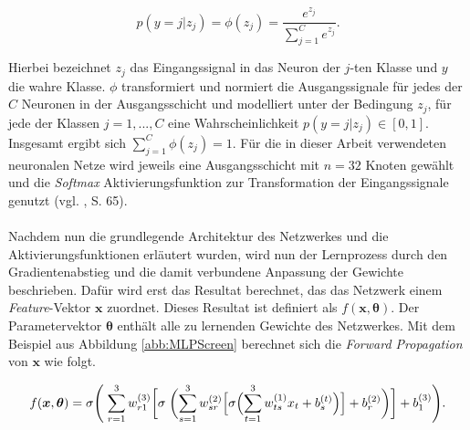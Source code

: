 \documentclass[a4paper,11pt]{article}
\begin{document}
\[p(y = j |z_j) = \phi(z_j) = \frac{e^{z_j}}{\sum_{j=1}^C e^{z_j}} .\]

Hierbei bezeichnet $z_j$ das Eingangssignal in das Neuron der $j$-ten Klasse und $y$ die wahre Klasse. $\phi$ transformiert und normiert die Ausgangssignale für jedes der $C$ Neuronen in der Ausgangsschicht und modelliert unter der Bedingung $z_j$, für jede der Klassen $j = 1,..., C$ eine Wahrscheinlichkeit $p(y=j|z_j) \in \left[0, 1\right]$. Insgesamt ergibt sich $\sum_{j = 1}^C \phi(z_j) = 1$. Für die in dieser Arbeit verwendeten neuronalen Netze wird jeweils eine Ausgangsschicht mit $n = 32$ Knoten gewählt und die \textit{Softmax} Aktivierungsfunktion zur Transformation der Eingangssignale genutzt (vgl. \cite{deepEssentials}, S. 65).\\
\\
Nachdem nun die grundlegende Architektur des Netzwerkes und die Aktivierungsfunktionen erläutert wurden, wird nun der Lernprozess durch den Gradientenabstieg und die damit verbundene Anpassung der Gewichte beschrieben. Dafür wird erst das Resultat berechnet, das das Netzwerk einem \textit{Feature}-Vektor $\bm{x}$ zuordnet. Dieses Resultat ist definiert als $f(\bm{x}, \bm{\theta})$. Der Parametervektor $\bm{\theta}$ enthält alle zu lernenden Gewichte des Netzwerkes. Mit dem Beispiel aus Abbildung \ref{abb:MLPScreen} berechnet sich die \textit{Forward Propagation} von $\bm{x}$ wie folgt. 

\begin{equation}\label{eq:ForwardProp}
 f(\bm{x}, \bm{\theta}) = \sigma \Biggl( \hspace{0.1cm}  \sum_{r=1}^{3}  w_{r1}^{(3)} \biggl[ \sigma \hspace{0.1cm} \biggl(\sum_{s=1}^{3} w_{sr}^{(2)} \Bigl[ \sigma \Bigl( \sum_{t=1}^{3} w_{ts}^{(1)} x_{t} + b_s^{(t)} \Bigr) \Bigr]  + b_r^{(2)} \biggr)  \biggr] + b_1^{(3)} \Biggr).    
\end{equation}{}
\end{document}
